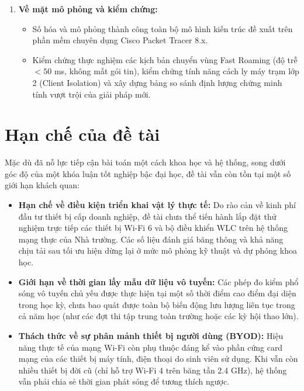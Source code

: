 \begin{enumerate}
\begin{itemize}
        \item Quy hoạch có trọng điểm chuẩn Wi-Fi 6 cho các khu vực mật độ cao và tái luân chuyển thiết bị chuẩn cũ cho các văn phòng hành chính, tối ưu hóa ngân sách đầu tư.
        \item Đề xuất phân hoạch mạng logic VLAN với không gian địa chỉ IP /20 (hơn 8.000 IP cho sinh viên), kết hợp chiến lược rút ngắn thời gian thuê DHCP Lease Time xuống 2 -- 4 giờ để giải quyết dứt điểm lỗi cạn kiệt IP.
        \item Thiết lập cơ chế định tuyến theo chính sách PBR đa WAN ưu tiên khối giảng viên và cân bằng tải khối sinh viên; chuyển đổi sang phương thức xác thực tập trung an toàn cấp doanh nghiệp 802.1X/EAP trên nền máy chủ Active Directory/LDAP sẵn có.
      \end{itemize}
    \item \textbf{Về mặt mô phỏng và kiểm chứng:}
      \begin{itemize}
        \item Số hóa và mô phỏng thành công toàn bộ mô hình kiến trúc đề xuất trên phần mềm chuyên dụng Cisco Packet Tracer 8.x.
        \item Kiểm chứng thực nghiệm các kịch bản chuyển vùng Fast Roaming (độ trễ $< 50$ ms, không mất gói tin), kiểm chứng tính năng cách ly máy trạm lớp 2 (Client Isolation) và xây dựng bảng so sánh định lượng chứng minh tính vượt trội của giải pháp mới.
      \end{itemize}
\end{enumerate}

\section{Hạn chế của đề tài}

Mặc dù đã nỗ lực tiếp cận bài toán một cách khoa học và hệ thống, song dưới góc độ của một khóa luận tốt nghiệp bậc đại học, đề tài vẫn còn tồn tại một số giới hạn khách quan:
\begin{itemize}
    \item \textbf{Hạn chế về điều kiện triển khai vật lý thực tế:} Do rào cản về kinh phí đầu tư thiết bị cấp doanh nghiệp, đề tài chưa thể tiến hành lắp đặt thử nghiệm trực tiếp các thiết bị Wi-Fi 6 và bộ điều khiển WLC trên hệ thống mạng thực của Nhà trường. Các số liệu đánh giá băng thông và khả năng chịu tải sau tối ưu hiện dừng lại ở mức mô phỏng kỹ thuật và dự phóng khoa học.
    \item \textbf{Giới hạn về thời gian lấy mẫu dữ liệu vô tuyến:} Các phép đo kiểm phổ sóng vô tuyến chủ yếu được thực hiện tại một số thời điểm cao điểm đại diện trong học kỳ, chưa bao quát được toàn bộ biến động lưu lượng liên tục trong cả năm học (như các đợt thi tập trung toàn trường hoặc các kỳ hội thao lớn).
    \item \textbf{Thách thức về sự phân mảnh thiết bị người dùng (BYOD):} Hiệu năng thực tế của mạng Wi-Fi còn phụ thuộc đáng kể vào phần cứng card mạng của các thiết bị máy tính, điện thoại do sinh viên sử dụng. Khi vẫn còn nhiều thiết bị đời cũ (chỉ hỗ trợ Wi-Fi 4 trên băng tần 2.4 GHz), hệ thống vẫn phải chia sẻ thời gian phát sóng để tương thích ngược.
\end{itemize}

